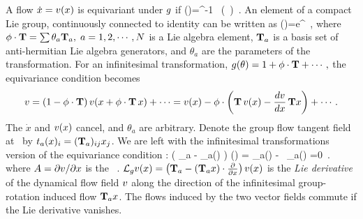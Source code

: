 {    
A flow $\dot{x}= v(x)$ is equivariant under %
$g$ if
\beq
\vel(\ssp)=\LieEl^{-1} \, \vel(\LieEl \, \ssp)
\,.
An element of a compact Lie group, continuously connected to identity
can be written as
\beq
\LieEl(\theta)=e^{\gSpace \cdot \Lg }
\,,
where
$\gSpace \cdot \Lg = \sum \theta_a \Lg_a,\; a=1,2, \cdots, N$
is a Lie algebra element, $\Lg_a$ is a basis set of
anti-hermitian Lie algebra generators, and $\theta_a$ are the
parameters of the transformation. For an infinitesimal
transformation,
$ %
\LieEl(\theta)=1+ \gSpace \cdot \Lg + \cdots
\,,
$ %
the equivariance condition  becomes
\[
\vel=(1-\gSpace \cdot \Lg) \, \vel(\ssp+\gSpace \cdot \Lg \, \ssp) + \cdots
       =\vel(\ssp)- \gSpace \cdot \left(
            \Lg \, \vel(\ssp) - \frac{d\vel}{d\ssp} \, \Lg \ssp
                     \right)  + \cdots
\,.
\]
The $\dot{x}$ and $v(x)$ cancel, and $\theta_a$ are
arbitrary. Denote the group flow tangent field at \ssp\ by
$t_a(x)_{i}= (\mathbf{T}_a)_{ij} x_j$.
We are left with the infinitesimal transformations
version of the equivariance condition :
\beq
  \left(
    \Lg_a  - \groupTan_a(\ssp) \cdot \frac{\partial}{\partial \ssp}
  \right) \vel(\ssp) =
  \groupTan_a(\vel)  - \Mvar \, \groupTan_a(\ssp) =0
  \,.
where $A = {\partial v}/{\partial x}$ is the \stabmat\ .
$  {\cal L}_g v(x) = \left(\mathbf{T}_a  - (\mathbf{T}_a x) \cdot
\frac{\partial}{\partial x} \right) v(x) $ is the {\em
Lie derivative} of the dynamical flow field $v$ along the direction
of the infinitesimal group-rotation induced flow $\mathbf{T}_a x$.
The flows induced by the two vector fields commute if the Lie
derivative
vanishes. %

}
